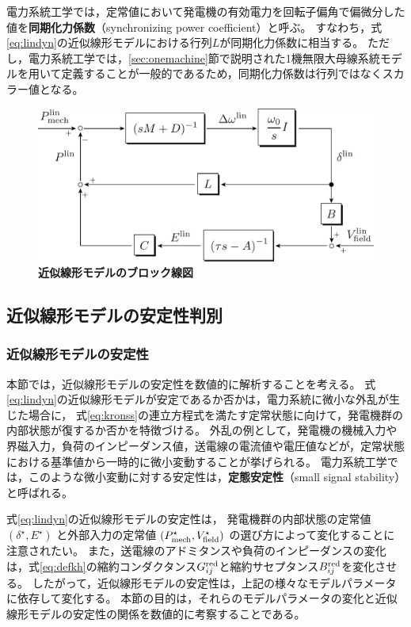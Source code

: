 \documentclass[tombow,dvipdfmx]{corona-a5-1.1}
\begin{document}
電力系統工学では，定常値において発電機の有効電力を回転子偏角で偏微分した値を\textbf{同期化力係数}（synchronizing power coefficient）と呼ぶ\cite[8.4節]{kato2017electric}。
すなわち，式\ref{eq:lindyn}の近似線形モデルにおける行列$L$が同期化力係数に相当する。
ただし，電力系統工学では，\ref{sec:onemachine}節で説明された1機無限大母線系統モデルを用いて定義することが一般的であるため，同期化力係数は行列ではなくスカラー値となる。


\begin{figure}[t]
\centering
\includegraphics[width = .8\linewidth]{figs/blocklinsys3}
\medskip
\caption{\textbf{近似線形モデルのブロック線図}}
\label{fig:blocklinsys}
\medskip
\end{figure}

\subsection{近似線形モデルの安定性判別}

\smallskip
\subsubsection{近似線形モデルの安定性}

本節では，近似線形モデルの安定性を数値的に解析することを考える。
式\ref{eq:lindyn}の近似線形モデルが安定であるか否かは，電力系統に微小な外乱が生じた場合に，
式\ref{eq:kronss}の連立方程式を満たす定常状態に向けて，発電機群の内部状態が復するか否かを特徴づける。
外乱の例として，発電機の機械入力や界磁入力，負荷のインピーダンス値，送電線の電流値や電圧値などが，定常状態における基準値から一時的に微小変動することが挙げられる。
電力系統工学では，このような微小変動に対する安定性は，\textbf{定態安定性}（small signal stability）と呼ばれる。


式\ref{eq:lindyn}の近似線形モデルの安定性は，
発電機群の内部状態の定常値
$(\delta^{\star},E^{\star})$
と外部入力の定常値
$(P_{{\rm mech}}^{\star},V_{{\rm field}}^{\star})$
の選び方によって変化することに注意されたい。
また，送電線のアドミタンスや負荷のインピーダンスの変化は，式\ref{eq:defkh}の縮約コンダクタンス$G^{\rm red}_{ij}$と縮約サセプタンス$B^{\rm red}_{ij}$を変化させる。
したがって，近似線形モデルの安定性は，上記の様々なモデルパラメータに依存して変化する。
本節の目的は，それらのモデルパラメータの変化と近似線形モデルの安定性の関係を数値的に考察することである。
\end{document}
